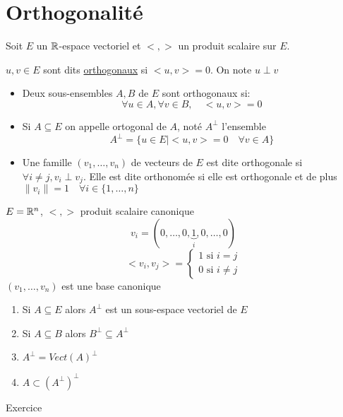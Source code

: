 \section{Orthogonalité}
Soit $E$ un  $\mathbb{R}$-espace vectoriel et  $< , >$ un produit scalaire sur  $E$.
\begin{definition}\label{def:orthogonal}
     $u, v \in E$ sont dits \underline{orthogonaux} si  $<u, v> = 0$. On note  $u \perp v$
      \begin{itemize}
         \item Deux sous-ensembles $A, B$ de  $E$ sont orthogonaux si:
              \[
             \forall u \in A, \forall v \in B, \quad <u, v> = 0
             \] 
         \item Si $A \subseteq E$ on appelle ortogonal de $A$, noté  $A^{\perp}$ l'ensemble
              \[
                  A^{\perp} = \{ u \in E \mid <u, v> = 0 \quad \forall v \in A \}
             \] 
         \item Une famille $(v_1, \ldots, v_n)$ de vecteurs de $E$ est dite orthogonale si  $\forall i \neq j, v_i \perp v_j$. Elle est dite orthonomée si elle est orthogonale et de plus $\|v_i\| = 1 \quad \forall i \in \{ 1, \ldots, n \}$
     \end{itemize}
\end{definition}
\begin{eg}
   $E = \mathbb{R}^n$,  $< , >$ produit scalaire canonique 
   \[
       v_i = (0, \ldots, 0, \underbrace{1}_{i}, 0, \ldots, 0)
   \] 
   \[
   <v_i, v_j> = \begin{cases}
       1 \text{ si } i = j\\  
       0 \text{ si } i \neq  j
   \end{cases}
   \] 
   $(v_1, \ldots, v_n)$ est une base canonique
\end{eg}
\begin{prop}
    \begin{enumerate}
        \item 
            Si $A \subseteq E$ alors $A^{\perp}$ est un sous-espace vectoriel de  $E$ 
        \item Si $A \subseteq B$ alors $B^{\perp} \subseteq A^{\perp}$
        \item $A^{\perp} = Vect(A)^{\perp}$
        \item $A \subset (A^{\perp})^{\perp}$ 
    \end{enumerate}
\end{prop}
\begin{explanation}
   Exercice 
\end{explanation}
